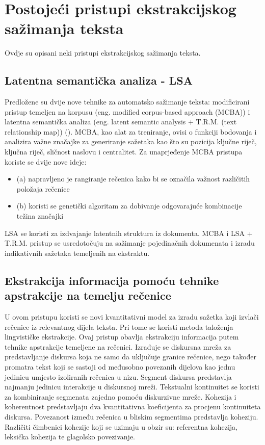 \documentclass[times, utf8, zavrsni, numeric]{fer}
\begin{document}
\section{Postojeći pristupi ekstrakcijskog sažimanja teksta}
Ovdje su opisani neki pristupi ekstrakcijskog sažimanja teksta.
\subsection{Latentna semantička analiza - LSA}
Predložene su dvije nove tehnike za automatsko sažimanje teksta: modificirani pristup temeljen na korpusu (eng. modified corpus-based approach (MCBA)) i latentna semantička analiza (eng. latent semantic analysis + T.R.M. (text relationship map)) (\citet{article1}).
MCBA, kao alat za treniranje, ovisi o funkciji bodovanja i analizira važne značajke za generiranje sažetaka kao što su pozicija ključne riječ, ključna riječ, sličnost naslovu i centralitet.
Za unaprjeđenje MCBA pristupa koriste se dvije nove ideje:
\begin{itemize}
  \item (a) napravljeno je rangiranje rečenica kako bi se označila važnost različitih položaja rečenice
  \item (b) koristi se genetički algoritam za dobivanje odgovarajuće kombinacije težina značajki
\end{itemize}
\par
LSA se koristi za izdvajanje latentnih struktura iz dokumenta. MCBA i LSA + T.R.M. pristup se usredotočuju na sažimanje pojedinačnih dokumenata i izradu indikativnih sažetaka temeljenih na ekstraktu.

\subsection{Ekstrakcija informacija pomoću tehnike apstrakcije  na temelju rečenice}
U ovom pristupu koristi se novi kvantitativni model za izradu sažetka koji izvlači rečenice iz relevantnog dijela teksta.
Pri tome se koristi metoda taloženja lingvističke ekstrakcije.
Ovaj pristup obavlja ekstrakciju informacija putem tehnike apstrakcije temeljene na rečenici.
Izrađuje se diskursna mreža za predstavljanje diskursa koja ne samo da uključuje granice rečenice, nego također promatra tekst koji se sastoji od međusobno povezanih dijelova kao jednu jedinicu umjesto izoliranih rečenica u nizu.
Segment diskursa predstavlja najmanju jedinicu interakcije u diskursnoj mreži.
Tekstualni kontinuitet se koristi za kombiniranje segmenata zajedno pomoću diskurzivne mreže.
Kohezija i koherentnost predstavljaju dva kvantitativna koeficijenta za procjenu kontinuiteta diskursa.
Povezanost između rečenica u bliskim segmentima predstavlja koheziju.
Različiti čimbenici kohezije koji se uzimaju u obzir su: referentna kohezija, leksička kohezija te glagolsko povezivanje.
\end{document}
